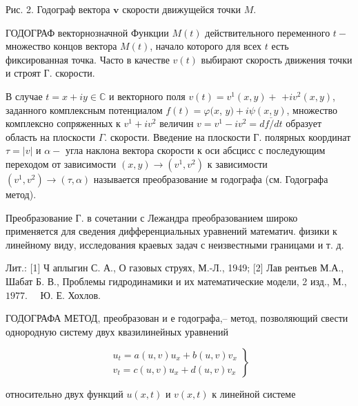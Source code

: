 \documentclass[10pt]{article}
\begin{document}
Рис. 2. Годограф вектора $\boldsymbol{v}$ скорости движущейся точки $M$.



ГОДОГРАФ векторнозначной Функции $M(t)$ действительного переменного $t-$ множество концов вектора $M(t)$, начало которого для всех $t$ есть фиксированная точка. Часто в качестве $v(t)$ выбирают скорость движения точки и строят Г. скорости.



В случае $t=x+i y \in \mathbb{C}$ и векторного поля $v(t)=v^{1}(x, y)+$ $+i v^{2}(x, y)$, заданного комплексным потенциалом $f(t)=\varphi(x$, $y)+i \psi(x, y)$, множество комплексно сопряженных к $v^{1}+i v^{2}$ величин $v=v^{1}-i v^{2}=\overline{d f / d t}$ образует область на плоскости $\Gamma$. скорости. Введение на плоскости Г. полярных координат $\tau=|v|$ и $\alpha-$ угла наклона вектора скорости к оси абсцисс с последующим переходом от зависимости $(x, y) \rightarrow\left(v^{1}, v^{2}\right)$ к зависимости $\left(v^{1}, v^{2}\right) \rightarrow(\tau, \alpha)$ называется преобразование м годографа (см. Годографа метод).



Преобразование Г. в сочетании с Лежандра преобразованием широко применяется для сведения дифференциальных уравнений математич. физики к линейному виду, исследования краевых задач с неизвестными границами и т. д.



Лит.: [1] Ч аплыгин С. А., О газовых струях, М.-Л., 1949; [2] Лав рентьев М.А., Шабат Б. В., Проблемы гидродинамики и их математические модели, 2 изд., М., $1977 . \quad$ Ю. Е. Хохлов.



ГОДОГРАФА МЕТОД, преобразован и е годографа,-- метод, позволяющий свести однородную систему двух квазилинейных уравнений



\[

\left.\begin{array}{l}

u_{t}=a(u, v) u_{x}+b(u, v) v_{x} \\

v_{t}=c(u, v) u_{x}+d(u, v) v_{x}

\end{array}\right\}

\]



относительно двух функций $u(x, t)$ и $v(x, t)$ к линейной системе
\end{document}
